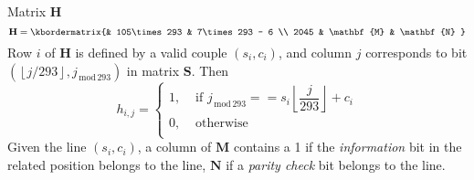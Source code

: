 \documentclass[pdf]
          {beamer}
\newcommand{\lmod}[1] {_{\,\mathrm{mod}\,#1}}
\begin{document}
\begin{frame}{Matrix $\mathbf{H}$}
	\begin{equation*}
		\mathbf{H} = 
			\kbordermatrix{%
					& 105\times293 & 7\times293 - 6 \\
				2045 & \mathbf{M} & \mathbf{N}
			}
	\end{equation*}
	Row $i$ of $\mathbf{H}$ is defined by a valid couple $(s_i, c_i)$, and column $j$ corresponds to bit $(\left\lfloor j/293 \right\rfloor, j\lmod{293})$ in matrix $\mathbf{S}$. Then
	\begin{equation*}
		h_{i, j} = \begin{cases}
			1, &\text{ if }j\lmod{293} == s_i\left\lfloor\dfrac{j}{293}\right\rfloor + c_i\\
			0, &\text{ otherwise}\\
		\end{cases}
	\end{equation*}
	Given the line $(s_i, c_i)$, a column of $\mathbf{M}$ contains a 1 if the \textit{information} bit in the related position belongs to the line, $\mathbf{N}$ if a \textit{parity check} bit belongs to the line.
\end{frame}
\end{document}
